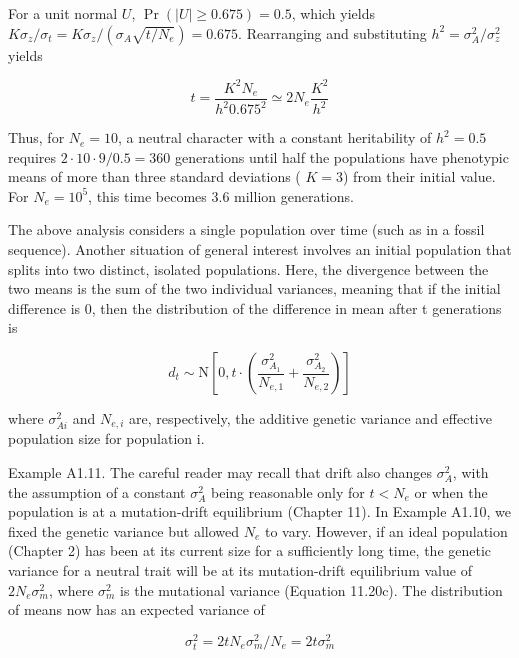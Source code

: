\documentclass{article}
\begin{document}
For a unit normal $U$, $\Pr(|U| \geq 0.675) = 0.5$, which yields $K\sigma_z/\sigma_t = K\sigma_z/(\sigma_A\sqrt{t/N_e}) = 0.675$. Rearranging and substituting $h^2 = \sigma_A^2/\sigma_z^2$ yields

\begin{equation}
t=\frac{K^{2}N_{e}}{h^{2}0.675^{2}}\simeq2N_{e}\frac{K^{2}}{h^{2}}
\end{equation}

Thus, for  $ N_e = 10 $, a neutral character with a constant heritability of  $ h^2 = 0.5 $ requires  $ 2 \cdot 10 \cdot 9/0.5 = 360 $ generations until half the populations have phenotypic means of more than three standard deviations ( $ K = 3 $) from their initial value. For  $ N_e = 10^5 $, this time becomes 3.6 million generations.

The above analysis considers a single population over time (such as in a fossil sequence). Another situation of general interest involves an initial population that splits into two distinct, isolated populations. Here, the divergence between the two means is the sum of the two individual variances, meaning that if the initial difference is 0, then the distribution of the difference in mean after t generations is

\begin{equation}
d_{t}\sim\mathrm{N}\left[0,t\cdot\left(\frac{\sigma_{A_{1}}^{2}}{N_{e,1}}+\frac{\sigma_{A_{2}}^{2}}{N_{e,2}}\right)\right]
\end{equation}

where  $ \sigma_{Ai}^{2} $ and  $ N_{e,i} $ are, respectively, the additive genetic variance and effective population size for population i.

Example A1.11. The careful reader may recall that drift also changes  $ \sigma_A^2 $, with the assumption of a constant  $ \sigma_A^2 $ being reasonable only for  $ t < N_e $ or when the population is at a mutation-drift equilibrium (Chapter 11). In Example A1.10, we fixed the genetic variance but allowed  $ N_e $ to vary. However, if an ideal population (Chapter 2) has been at its current size for a sufficiently long time, the genetic variance for a neutral trait will be at its mutation-drift equilibrium value of  $ 2N_e\sigma_m^2 $, where  $ \sigma_m^2 $ is the mutational variance (Equation 11.20c). The distribution of means now has an expected variance of

\begin{equation}
\sigma_{t}^{2}=2t N_{e}\sigma_{m}^{2}/N_{e}=2t\sigma_{m}^{2}
\end{equation}
\end{document}
